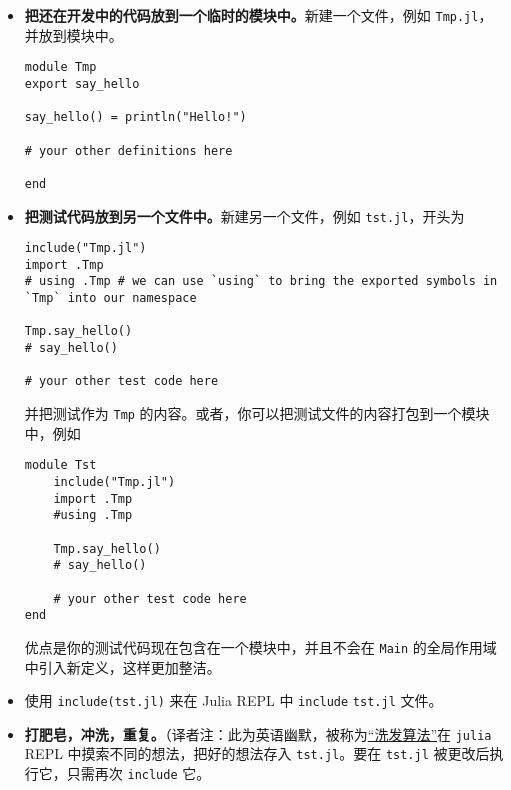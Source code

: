 \begin{itemize}
\item \textbf{把还在开发中的代码放到一个临时的模块中。}新建一个文件，例如 \texttt{Tmp.jl}，并放到模块中。


\begin{verbatim}
module Tmp
export say_hello

say_hello() = println("Hello!")

# your other definitions here

end
\end{verbatim}


\item \textbf{把测试代码放到另一个文件中。}新建另一个文件，例如 \texttt{tst.jl}，开头为


\begin{verbatim}
include("Tmp.jl")
import .Tmp
# using .Tmp # we can use `using` to bring the exported symbols in `Tmp` into our namespace

Tmp.say_hello()
# say_hello()

# your other test code here
\end{verbatim}

并把测试作为 \texttt{Tmp} 的内容。或者，你可以把测试文件的内容打包到一个模块中，例如


\begin{verbatim}
module Tst
    include("Tmp.jl")
    import .Tmp
    #using .Tmp

    Tmp.say_hello()
    # say_hello()

    # your other test code here
end
\end{verbatim}

优点是你的测试代码现在包含在一个模块中，并且不会在 \texttt{Main} 的全局作用域中引入新定义，这样更加整洁。


\item 使用 \texttt{include({\textquotedbl}tst.jl{\textquotedbl})} 来在 Julia REPL 中 \texttt{include} \texttt{tst.jl} 文件。


\item \textbf{打肥皂，冲洗，重复。}（译者注：此为英语幽默，被称为\href{https://en.wikipedia.org/wiki/Lather,\_rinse,\_repeat）描述洗头发的过程}{“洗发算法”}在 \texttt{julia} REPL 中摸索不同的想法，把好的想法存入 \texttt{tst.jl}。要在 \texttt{tst.jl} 被更改后执行它，只需再次 \texttt{include} 它。

\end{itemize}


\hypertarget{173246562791795014}{}


